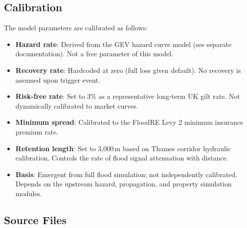 \documentclass[11pt,a4paper]{article}
\begin{document}
\subsection{Calibration}

The model parameters are calibrated as follows:

\begin{itemize}[nosep]
    \item \textbf{Hazard rate}: Derived from the GEV hazard curve model (see separate
          documentation). Not a free parameter of this model.
    \item \textbf{Recovery rate}: Hardcoded at zero (full loss given default). No recovery
          is assumed upon trigger event.
    \item \textbf{Risk-free rate}: Set to 3\% as a representative long-term UK gilt rate.
          Not dynamically calibrated to market curves.
    \item \textbf{Minimum spread}: Calibrated to the FloodRE Levy 2 minimum insurance
          premium rate.
    \item \textbf{Retention length}: Set to 3{,}000\,m based on Thames corridor hydraulic
          calibration. Controls the rate of flood signal attenuation with distance.
    \item \textbf{Basis}: Emergent from full flood simulation; not independently
          calibrated. Depends on the upstream hazard, propagation, and property
          simulation modules.
\end{itemize}


\mkmimplementation

\subsection{Source Files}
\end{document}
